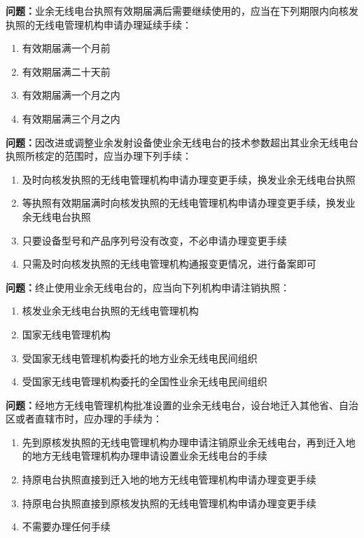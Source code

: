 \textbf{问题：}业余无线电台执照有效期届满后需要继续使用的，应当在下列期限内向核发执照的无线电管理机构申请办理延续手续：
\begin{enumerate}[label=\Alph*), leftmargin=3em]
	\item 有效期届满一个月前
	\item 有效期届满二十天前
	\item 有效期届满一个月之内
	\item 有效期届满三个月之内
\end{enumerate}

\textbf{问题：}因改进或调整业余发射设备使业余无线电台的技术参数超出其业余无线电台执照所核定的范围时，应当办理下列手续：
\begin{enumerate}[label=\Alph*), leftmargin=3em]
	\item 及时向核发执照的无线电管理机构申请办理变更手续，换发业余无线电台执照
	\item 等执照有效期届满时向核发执照的无线电管理机构申请办理变更手续，换发业余无线电台执照
	\item 只要设备型号和产品序列号没有改变，不必申请办理变更手续
	\item 只需及时向核发执照的无线电管理机构通报变更情况，进行备案即可
\end{enumerate}

\textbf{问题：}终止使用业余无线电台的，应当向下列机构申请注销执照：
\begin{enumerate}[label=\Alph*), leftmargin=3em]
	\item 核发业余无线电台执照的无线电管理机构
	\item 国家无线电管理机构
	\item 受国家无线电管理机构委托的地方业余无线电民间组织
	\item 受国家无线电管理机构委托的全国性业余无线电民间组织
\end{enumerate}

\textbf{问题：}经地方无线电管理机构批准设置的业余无线电台，设台地迁入其他省、自治区或者直辖市时，应办理的手续为：
\begin{enumerate}[label=\Alph*), leftmargin=3em]
	\item 先到原核发执照的无线电管理机构办理申请注销原业余无线电台，再到迁入地的地方无线电管理机构办理申请设置业余无线电台的手续
	\item 持原电台执照直接到迁入地的地方无线电管理机构申请办理变更手续
	\item 持原电台执照直接到原核发执照的无线电管理机构申请办理变更手续
	\item 不需要办理任何手续
\end{enumerate}

